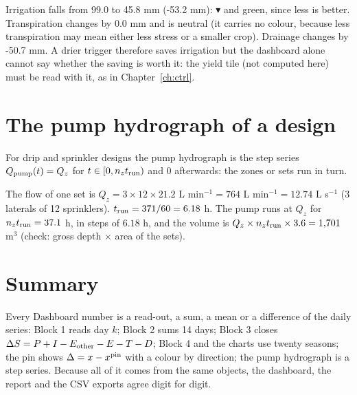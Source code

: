 \sol  Irrigation falls from 99.0 to 45.8 mm (-53.2 mm): $\blacktriangledown$ and green, since less is better. Transpiration changes by 0.0 mm and is neutral (it carries no colour, because less transpiration may mean either less stress or a smaller crop). Drainage changes by -50.7 mm. A drier trigger therefore saves irrigation but the dashboard alone cannot say whether the saving is worth it: the yield tile (not computed here) must be read with it, as in Chapter~\ref{ch:ctrl}.


\section{The pump hydrograph of a design}
For drip and sprinkler designs the pump hydrograph is the step series $Q_{\rm pump}(t)=Q_z$ for $t\in[0,n_zt_{\rm run})$ and 0 afterwards: the zones or sets run in turn.

\sol  The flow of one set is $Q_z=3\times12\times21.2$ L min$^{-1}=764$ L min$^{-1}=12.74$ L s$^{-1}$ (3 laterals of 12 sprinklers). $t_{\rm run}=371/60=6.18$ h. The pump runs at $Q_z$ for $n_zt_{\rm run}=37.1$ h, in steps of $6.18$ h, and the volume is $Q_z\times n_zt_{\rm run}\times3.6=1{,}701$ m$^3$ (check: gross depth $\times$ area of the sets).


\section{Summary}
Every Dashboard number is a read-out, a sum, a mean or a difference of the daily series: Block 1 reads day $k$; Block 2 sums 14 days; Block 3 closes $\Delta S=P+I-E_{\rm other}-E-T-D$; Block 4 and the charts use twenty seasons; the pin shows $\Delta=x-x^{\rm pin}$ with a colour by direction; the pump hydrograph is a step series. Because all of it comes from the same objects, the dashboard, the report and the CSV exports agree digit for digit.
